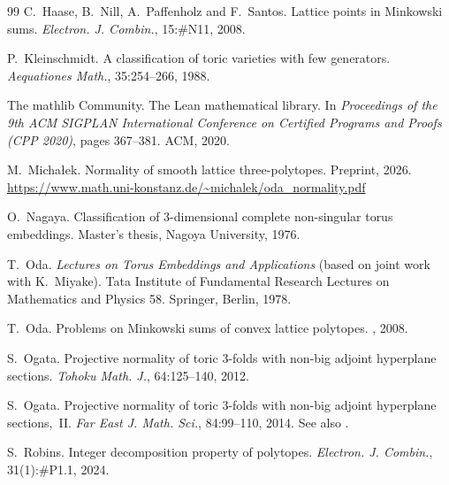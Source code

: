 \documentclass[12pt]{article}
\begin{document}
{\begin{thebibliography}{99}
C.~Haase, B.~Nill, A.~Paffenholz and F.~Santos.
Lattice points in Minkowski sums.
\emph{Electron. J. Combin.}, 15:\#N11, 2008. 

P.~Kleinschmidt.
A classification of toric varieties with few generators.
\emph{Aequationes Math.}, 35:254--266, 1988. 

The mathlib Community.
The Lean mathematical library.
In \emph{Proceedings of the 9th ACM SIGPLAN International Conference on Certified Programs and Proofs (CPP 2020)}, pages 367--381. ACM, 2020. 

M.~Micha\l{}ek.
Normality of smooth lattice three-polytopes.
Preprint, 2026. \url{https://www.math.uni-konstanz.de/~michalek/oda_normality.pdf}

O.~Nagaya.
Classification of 3-dimensional complete non-singular torus embeddings.
Master's thesis, Nagoya University, 1976.

T.~Oda.
\emph{Lectures on Torus Embeddings and Applications} (based on joint work with K.~Miyake).
Tata Institute of Fundamental Research Lectures on Mathematics and Physics 58. Springer, Berlin, 1978.

T.~Oda.
Problems on Minkowski sums of convex lattice polytopes.
, 2008.

S.~Ogata.
Projective normality of toric 3-folds with non-big adjoint hyperplane sections.
\emph{Tohoku Math. J.}, 64:125--140, 2012. 

S.~Ogata.
Projective normality of toric 3-folds with non-big adjoint hyperplane sections,~II.
\emph{Far East J. Math. Sci.}, 84:99--110, 2014. See also .

S.~Robins.
Integer decomposition property of polytopes.
\emph{Electron. J. Combin.}, 31(1):\#P1.1, 2024. 

\end{thebibliography}
}
\end{document}
